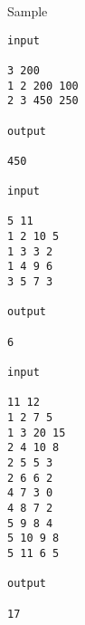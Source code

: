 Sample
\begin{verbatim}
input 
 
3 200 
1 2 200 100 
2 3 450 250 
 
output 
 
450

input 
 
5 11 
1 2 10 5 
1 3 3 2 
1 4 9 6 
3 5 7 3 
 
output 
 
6

input 
 
11 12 
1 2 7 5 
1 3 20 15 
2 4 10 8 
2 5 5 3 
2 6 6 2 
4 7 3 0 
4 8 7 2 
5 9 8 4 
5 10 9 8 
5 11 6 5 
 
output 
 
17\end{verbatim}